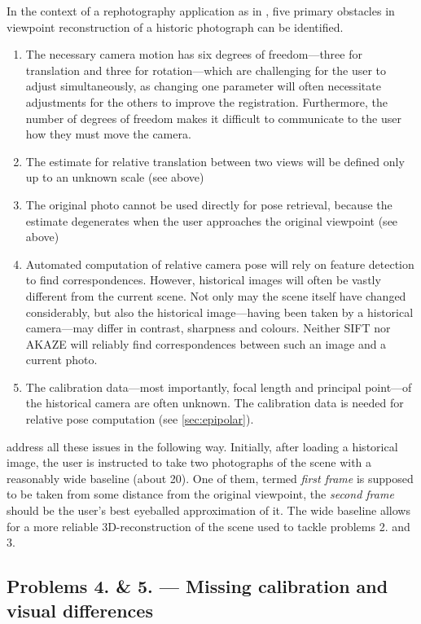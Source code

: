 In the context of a rephotography application as in \citep{bae2010}, five
primary obstacles in viewpoint reconstruction of a historic photograph can be
identified.
\begin{enumerate}
   \item The necessary camera motion has six degrees of freedom---three for
      translation and three for rotation---which are challenging for the user
      to adjust simultaneously, as changing one parameter will often necessitate
      adjustments for the others to improve the registration. Furthermore, the
      number of degrees of freedom makes it difficult to communicate to the
      user how they must move the camera.
   \item The estimate for relative translation between two views will be defined
      only up to an unknown scale (see above)
   \item The original photo cannot be used directly for pose retrieval, because
      the estimate degenerates when the user approaches the original viewpoint
      (see above)
   \item Automated computation of relative camera pose will rely on feature
      detection to find correspondences. However, historical images will often
      be vastly different from the current scene. Not only may the scene itself
      have changed considerably, but also the historical image---having been
      taken by a historical camera---may differ in contrast, sharpness and
      colours. Neither SIFT nor AKAZE will reliably find correspondences between
      such an image and a current photo.
   \item The calibration data---most importantly, focal length and principal
      point---of the historical camera are often unknown. The calibration data
      is needed for relative pose computation (see \autoref{sec:epipolar}).
\end{enumerate}

\citet{bae2010} address all these issues in the following way.
Initially, after loading a historical image, the user is instructed to
take two photographs of the scene with a reasonably wide baseline (about
20\textdegree). One of them, termed \emph{first frame} is supposed to be
taken from some distance from the original viewpoint, the \emph{second
frame} should be the user's best eyeballed approximation of it. The wide
baseline allows for a more reliable 3D-reconstruction of the scene used to
tackle problems 2. and 3. 

\subsection*{Problems 4. \& 5. --- Missing calibration and visual differences}

